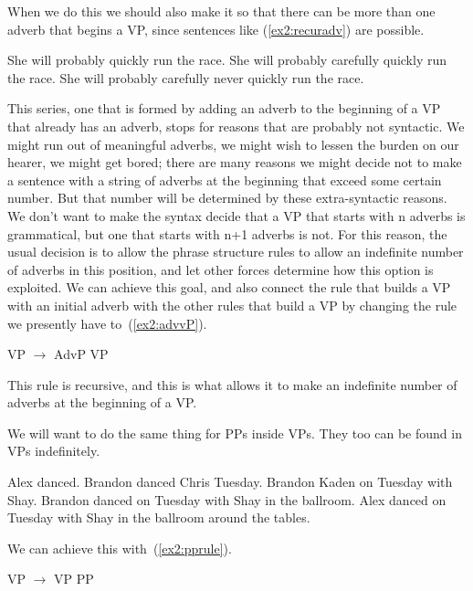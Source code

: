 When we do this we should also make it so that there can be more than one adverb that begins a VP, since sentences like (\ref{ex2:recuradv}) are possible.
\begin{exe}
	\raggedright
	\ex \label{ex2:recuradv} 
	\begin{xlist}
		\ex She will probably quickly run the race.
		\ex She will probably carefully quickly run the race.
		\ex She will probably carefully never quickly run the race.
	\end{xlist}
\end{exe}
This series, one that is formed by adding an adverb to the beginning of a VP that already has an adverb, stops for reasons that are probably not syntactic. We might run out of meaningful adverbs, we might wish to lessen the burden on our hearer, we might get bored; there are many reasons we might decide not to make a sentence with a string of adverbs at the beginning that exceed some certain number. But that number will be determined by these extra-syntactic reasons. We don't want to make the syntax decide that a VP that starts with n adverbs is grammatical, but one that starts with n+1 adverbs is not. For this reason, the usual decision is to allow the phrase structure rules to allow an indefinite number of adverbs in this position, and let other forces determine how this option is exploited. We can achieve this goal, and also connect the rule that builds a VP with an initial adverb with the other rules that build a VP by changing the rule we presently have to~(\ref{ex2:advvP}).
\begin{exe}
	\raggedright
	\ex \label{ex2:advvP} 
	VP $\rightarrow$ AdvP VP
\end{exe}
This rule is recursive, and this is what allows it to make an indefinite number of adverbs at the beginning of a VP.

We will want to do the same thing for PPs inside VPs. They too can be found in VPs indefinitely.
\begin{exe}
	\raggedright
	\ex \label{ex2:pprecurs} 
	\begin{xlist}
		\ex Alex danced.
		\ex Brandon danced Chris Tuesday.
		\ex Brandon Kaden on Tuesday with Shay.
		\ex Brandon danced on Tuesday with Shay in the ballroom.
		\ex Alex danced on Tuesday with Shay in the ballroom around the tables.
	\end{xlist}
\end{exe}
We can achieve this with~(\ref{ex2:pprule}).
\begin{exe}
	\raggedright
	\ex \label{ex2:pprule} 
	VP $\rightarrow$ VP PP
\end{exe}

